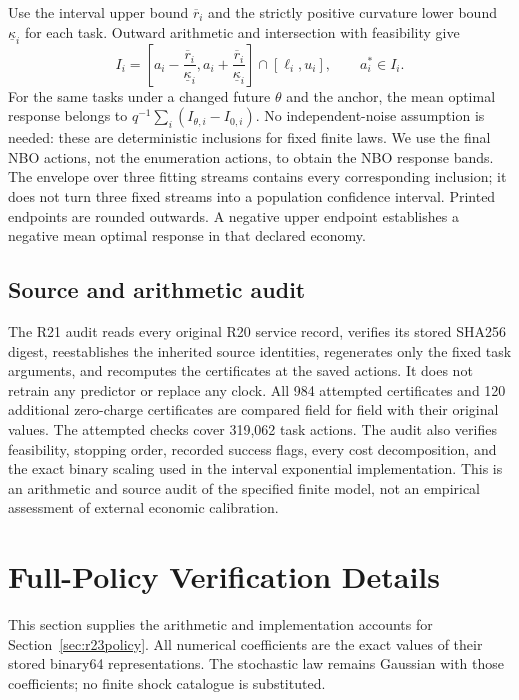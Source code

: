 \documentclass[ecta,nameyear,draft]{econsocart}
\theoremstyle{definition}
\theoremstyle{remark}
\begin{document}
Use the interval upper bound $\overline r_i$ and the strictly positive
curvature lower bound $\underline\kappa_i$ for each task. Outward arithmetic
and intersection with feasibility give
\[
 I_i=\left[a_i-\frac{\overline r_i}{\underline\kappa_i},
           a_i+\frac{\overline r_i}{\underline\kappa_i}\right]
                   \cap[\ell_i,u_i],\qquad a_i^*\in I_i.
\]
For the same tasks under a changed future $\theta$ and the anchor, the mean
optimal response belongs to $q^{-1}\sum_i(I_{\theta,i}-I_{0,i})$.
No independent-noise assumption is needed: these are deterministic
inclusions for fixed finite laws. We use the final NBO actions, not the
enumeration actions, to obtain the NBO response bands. The envelope over
three fitting streams contains every corresponding inclusion; it does not
turn three fixed streams into a population confidence interval. Printed
endpoints are rounded outwards. A negative upper endpoint establishes a
negative mean optimal response in that declared economy.

\subsection{Source and arithmetic audit}
The R21 audit reads every original R20 service record, verifies its stored
SHA256 digest, reestablishes the inherited source identities, regenerates
only the fixed task arguments, and recomputes the certificates at the saved
actions. It does not retrain any predictor or replace any clock. All
984 attempted certificates and 120 additional zero-charge certificates are
compared field for field with their original values. The attempted checks
cover 319,062 task actions. The audit also verifies feasibility, stopping
order, recorded success flags, every cost decomposition, and the exact
binary scaling used in the interval exponential implementation. This is an
arithmetic and source audit of the specified finite model, not an empirical
assessment of external economic calibration.

\section{Full-Policy Verification Details}\label{sec:r23proofs}
This section supplies the arithmetic and implementation accounts for
Section~\ref{sec:r23policy}. All numerical coefficients are the exact values
of their stored binary64 representations. The stochastic law remains
Gaussian with those coefficients; no finite shock catalogue is substituted.
\end{document}
